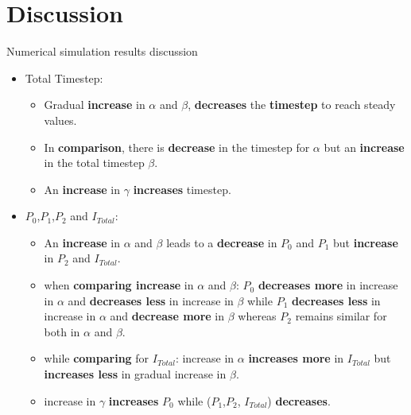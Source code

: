 \documentclass[smaller,aspectratio=169, toc=bibliography]{beamer}
\begin{document}
\section{Discussion}
\begin{frame}[fragile]{Numerical simulation results discussion }

\begin{itemize}
\item Total Timestep: 
\begin{itemize}
 \item Gradual \textbf{increase} in $\alpha$ and $\beta$, \textbf{decreases} the \textbf{timestep} to reach steady values. 
 \item In \textbf{comparison}, there is \textbf{decrease} in the timestep for $\alpha$ but an \textbf{increase} in the total timestep \textbf{$\beta$}.
 \item An \textbf{increase} in $\gamma$ \textbf{increases} timestep. %
\end{itemize}  

\item $P_0$,$P_1$,$P_2$ and $I_{Total}$:
\begin{itemize}
 \item An \textbf{increase} in $\alpha$ and $\beta$ leads to a \textbf{decrease} in $P_0$ and $P_1$ but \textbf{increase} in $P_2$ and $I_{Total}$.
 \item when \textbf{ comparing increase } in $\alpha$ and $\beta$: $P_0$ \textbf{decreases more} in increase in $\alpha$ and \textbf{decreases less} in increase in $\beta$ while $P_1$ \textbf{decreases less} in increase in $\alpha$ and \textbf{decrease more} in $\beta$ whereas $P_2$ remains similar for both  in $\alpha$ and $\beta$.
\item while \textbf{comparing} for $I_{Total}$: increase in $\alpha$ \textbf{increases more} in $I_{Total}$ but \textbf{increases less} in gradual increase in $\beta$. 
\item increase in $\gamma$ \textbf{increases} $P_0$ while ($P_1$,$P_2$, $I_{Total}$) \textbf{decreases}. 
\end{itemize}  
\end{itemize}
\end{frame}
\end{document}
